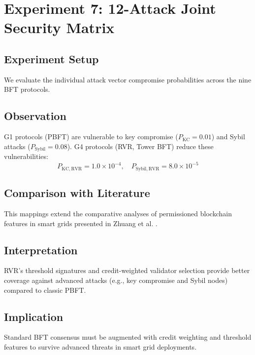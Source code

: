 \documentclass[12pt, oneside, a4paper]{report}
\theoremstyle{definition}
\theoremstyle{remark}
\begin{document}
\bigskip

\section{Experiment 7: 12-Attack Joint Security Matrix}
\label{sec:res:e7}

\subsection{Experiment Setup}
We evaluate the individual attack vector compromise probabilities across the nine BFT protocols.

\subsection{Observation}
G1 protocols (PBFT) are vulnerable to key compromise ($P_{\mathrm{KC}}=0.01$) and Sybil attacks ($P_{\mathrm{Sybil}}=0.08$). G4 protocols (RVR, Tower BFT) reduce these vulnerabilities:
\begin{equation}
P_{\mathrm{KC,RVR}} = 1.0 \times 10^{-4}, \quad P_{\mathrm{Sybil,RVR}} = 8.0 \times 10^{-5}
\end{equation}

\subsection{Comparison with Literature}
This mappings extend the comparative analyses of permissioned blockchain features in smart grids presented in Zhuang et al. \cite{zhuang2020blockchain}.

\subsection{Interpretation}
RVR's threshold signatures and credit-weighted validator selection provide better coverage against advanced attacks (e.g., key compromise and Sybil nodes) compared to classic PBFT.

\subsection{Implication}
Standard BFT consensus must be augmented with credit weighting and threshold features to survive advanced threats in smart grid deployments.
\end{document}
